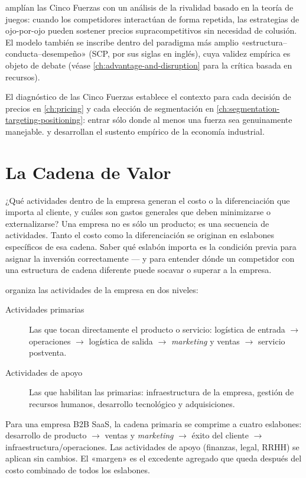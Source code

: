 \textcite{dranove7theconomics} amplían las Cinco Fuerzas con un análisis de la rivalidad
basado en la teoría de juegos: cuando los competidores interactúan de forma repetida, las
estrategias de ojo-por-ojo pueden sostener precios supracompetitivos sin necesidad de colusión.
El modelo también se inscribe dentro del paradigma más amplio «estructura--conducta--desempeño»
(SCP, por sus siglas en inglés), cuya validez empírica es objeto de debate (véase
\cref{ch:advantage-and-disruption} para la crítica basada en recursos).

El diagnóstico de las Cinco Fuerzas establece el contexto para cada decisión de precios en
\cref{ch:pricing} y cada elección de segmentación en
\cref{ch:segmentation-targeting-positioning}: entrar sólo donde al menos una fuerza sea
genuinamente manejable. \textcite{porter1980} y \textcite{dranove7theconomics} desarrollan el
sustento empírico de la economía industrial.

\section{La Cadena de Valor}\label{sec:value-chain}

¿Qué actividades dentro de la empresa generan el costo o la diferenciación que importa al
cliente, y cuáles son gastos generales que deben minimizarse o externalizarse? Una empresa no
es sólo un producto; es una secuencia de actividades. Tanto el costo como la diferenciación
se originan en eslabones específicos de esa cadena. Saber qué eslabón importa es la condición
previa para asignar la inversión correctamente --- y para entender dónde un competidor con una
estructura de cadena diferente puede socavar o superar a la empresa.

\textcite{porter1985} organiza las actividades de la empresa en dos niveles:
\begin{description}
  \item[Actividades primarias] Las que tocan directamente el producto o servicio:
    logística de entrada $\to$ operaciones $\to$ logística de salida $\to$
    \emph{marketing} y ventas $\to$ servicio postventa.
  \item[Actividades de apoyo] Las que habilitan las primarias: infraestructura de la empresa,
    gestión de recursos humanos, desarrollo tecnológico y adquisiciones.
\end{description}
Para una empresa B2B SaaS, la cadena primaria se comprime a cuatro eslabones:
desarrollo de producto $\to$ ventas y \emph{marketing} $\to$ éxito del cliente $\to$
infraestructura/operaciones. Las actividades de apoyo (finanzas, legal, RRHH) se aplican sin
cambios. El «margen» es el excedente agregado que queda después del costo combinado de todos
los eslabones.

